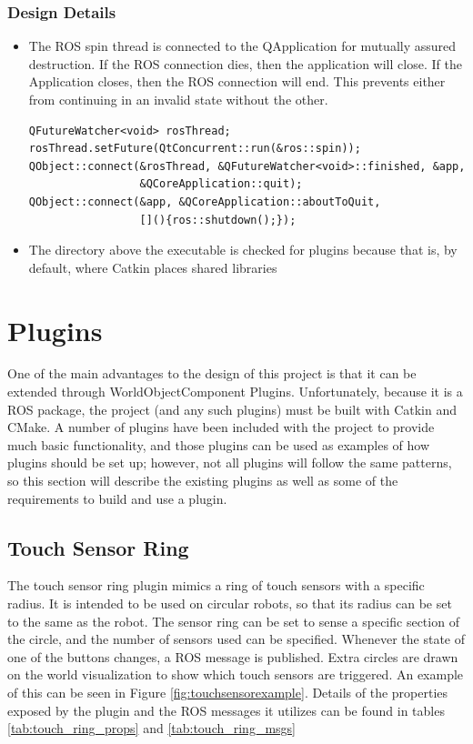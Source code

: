 \begin{itemize}
\subsubsection*{Design Details}
\begin{itemize}
	\item The ROS spin thread is connected to the QApplication for mutually assured destruction. If the ROS connection dies, then the application will close. If the Application closes, then the ROS connection will end. This prevents either from continuing in an invalid state without the other.
	\begin{lstlisting}
QFutureWatcher<void> rosThread;
rosThread.setFuture(QtConcurrent::run(&ros::spin));
QObject::connect(&rosThread, &QFutureWatcher<void>::finished, &app,
                 &QCoreApplication::quit);
QObject::connect(&app, &QCoreApplication::aboutToQuit,
                 [](){ros::shutdown();});
	\end{lstlisting}
	\item The directory above the executable is checked for plugins because that is, by default, where Catkin places shared libraries
\end{itemize}
\section{Plugins}
One of the main advantages to the design of this project is that it can be extended through WorldObjectComponent Plugins. Unfortunately, because it is a ROS package, the project (and any such plugins) must be built with Catkin and CMake. A number of plugins have been included with the project to provide much basic functionality, and those plugins can be used as examples of how plugins should be set up; however, not all plugins will follow the same patterns, so this section will describe the existing plugins as well as some of the requirements to build and use a plugin.
\subsection{Touch Sensor Ring}
The touch sensor ring plugin mimics a ring of touch sensors with a specific radius. It is intended to be used on circular robots, so that its radius can be set to the same as the robot. 
	The sensor ring can be set to sense a specific section of the circle, and the number of sensors used can be specified. Whenever the state of one of the buttons changes, a ROS message is published. Extra circles are drawn on the world visualization to show which touch sensors are triggered. An example of this can be seen in Figure \ref{fig:touchsensorexample}. Details of the properties exposed by the plugin and the ROS messages it utilizes can be found in tables \ref{tab:touch_ring_props} and \ref{tab:touch_ring_msgs}
	

\end{itemize}
